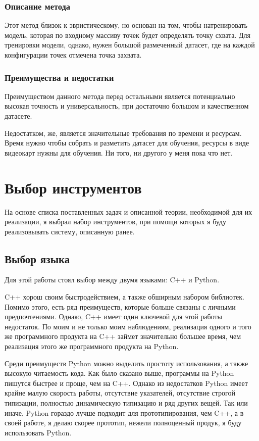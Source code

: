 \documentclass[12pt, a4paper]{article}
\begin{document}
\subsubsection{Описание метода}
Этот метод близок к эвристическому, но основан на том, чтобы натренировать
модель, которая по входному массиву точек будет определять точку схвата. Для
тренировки модели, однако, нужен большой размеченный датасет, где на каждой
конфигурации точек отмечена точка захвата.

\subsubsection{Преимущества и недостатки}
Преимуществом данного метода перед остальными является потенциально высокая точность и универсальность, при достаточно большом и качественном датасете.
\par
Недостатком, же, является значительные требования по времени и ресурсам. Время
нужно чтобы собрать и разметить датасет для обучения, ресурсы в виде видеокарт
нужны для обучения. Ни того, ни другого у меня пока что нет.
 
\section{Выбор инструментов}
На основе списка поставленных задач и описанной теории, необходимой для их реализации, я выбрал набор инструментов, при помощи которых я буду реализовывать систему, описанную ранее.

\subsection{Выбор языка}
Для этой работы стоял выбор между двумя языками: C++ и Python. 
\par
C++ хорош своим быстродействием, а также обширным набором библиотек.
Помимо этого, есть ряд преимуществ, которые больше связаны с личными предпочтениями.
Однако, C++ имеет один ключевой для этой работы недостаток. По моим и не только
моим наблюдениям, реализация одного и того же программного продукта на C++
займет значительно большее время, чем реализация этого же программного продукта
на Python.
\par
Среди преимуществ Python можно выделить простоту использования, а также высокую читаемость кода. Как было сказано выше, программы на Python пишутся быстрее и проще, чем на C++. Однако из недостатков Python имеет крайне малую скорость работы, отсутствие указателей, отсутствие строгой типизации, полностью динамическую типизацию и ряд других вещей. Так или иначе, Python гораздо лучше подходит для прототипирования, чем C++, а в своей работе, я делаю скорее прототип, нежели полноценный продук, я буду использовать Python.
\end{document}

